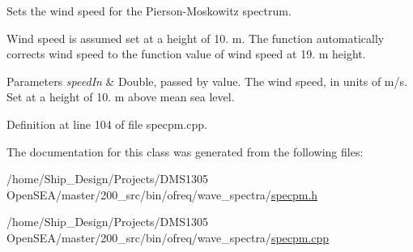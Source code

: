 Sets the wind speed for the Pierson-\/\-Moskowitz spectrum. 

Wind speed is assumed set at a height of 10. m. The function automatically corrects wind speed to the function value of wind speed at 19. m height. 
\begin{DoxyParams}{Parameters}
{\em speed\-In} & Double, passed by value. The wind speed, in units of m/s. Set at a height of 10. m above mean sea level. \\
\hline
\end{DoxyParams}


Definition at line 104 of file specpm.\-cpp.



The documentation for this class was generated from the following files\-:\begin{DoxyCompactItemize}
\item 
/home/\-Ship\-\_\-\-Design/\-Projects/\-D\-M\-S1305 Open\-S\-E\-A/master/200\-\_\-src/bin/ofreq/wave\-\_\-spectra/\hyperlink{specpm_8h}{specpm.\-h}\item 
/home/\-Ship\-\_\-\-Design/\-Projects/\-D\-M\-S1305 Open\-S\-E\-A/master/200\-\_\-src/bin/ofreq/wave\-\_\-spectra/\hyperlink{specpm_8cpp}{specpm.\-cpp}\end{DoxyCompactItemize}

